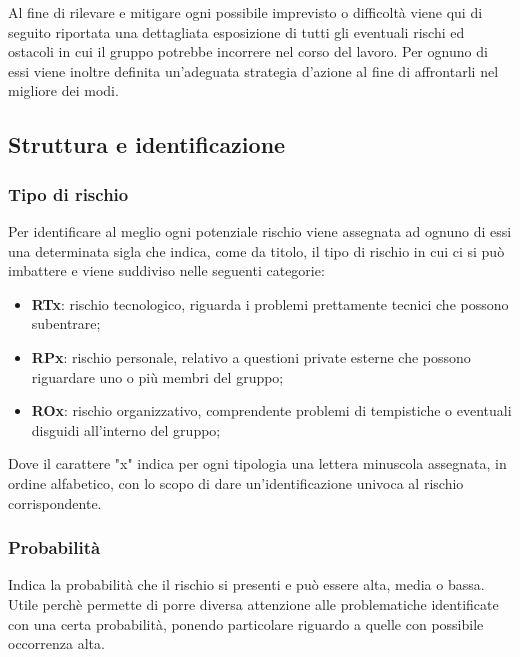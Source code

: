 Al fine di rilevare e mitigare ogni possibile imprevisto o difficoltà viene qui di seguito riportata una dettagliata esposizione di tutti gli eventuali rischi ed ostacoli in cui il gruppo \Gruppo{} potrebbe incorrere nel corso del lavoro. Per ognuno di essi viene inoltre definita un'adeguata strategia d'azione al fine di affrontarli nel migliore dei modi.

\subsection{Struttura e identificazione}
    
    \subsubsection{Tipo di rischio}
    Per identificare al meglio ogni potenziale rischio viene assegnata ad ognuno di essi una determinata sigla che indica, come da titolo, il tipo di rischio in cui ci si può imbattere e viene suddiviso nelle seguenti categorie:
        \begin{itemize}
            \item \textbf{RTx}: rischio tecnologico, riguarda i problemi prettamente tecnici che possono subentrare;
            \item \textbf{RPx}: rischio personale, relativo a questioni private esterne che possono riguardare uno o più membri del gruppo;
            \item \textbf{ROx}: rischio organizzativo, comprendente problemi di tempistiche o eventuali disguidi all'interno del gruppo;
        \end{itemize}
        Dove il carattere "x" indica per ogni tipologia una lettera minuscola assegnata, in ordine alfabetico, con lo scopo di dare un'identificazione univoca al rischio corrispondente.
    
    \subsubsection{Probabilità}
        Indica la probabilità che il rischio si presenti e può essere alta, media o bassa. Utile perchè permette di porre diversa attenzione alle problematiche identificate con una certa probabilità, ponendo particolare riguardo a quelle con possibile occorrenza alta.

